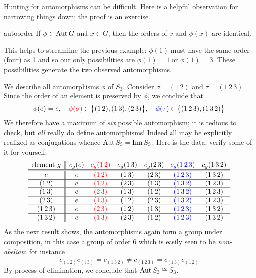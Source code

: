 Hunting for automorphisms can be difficult. Here is a helpful observation for narrowing things down; the proof is an exercise.

\begin{lemm}{}{autoorder}
If $\phi\in\operatorname{Aut} G$ and $x\in G$, then the orders of $x$ and $\phi(x)$ are identical.
\end{lemm}

This helps to streamline the previous example: $\phi(1)$ must have the same order (four) as 1 and so our only possibilities are $\phi(1)=1$ or $\phi(1)=3$. These possibilities generate the two observed automorphisms.
% 

\goodbreak


\begin{example}{}{}
We describe all automorphisms $\phi$ of $S_3$. Consider $\sigma=(1\,2)$ and $\tau=(1\,2\,3)$. Since the order of an element is preserved by $\phi$, we conclude that
  \[\phi(e)=e,\quad \textcolor{red}{\phi(\sigma)}\in\bigl\{(1\,2),(1\,3),(2\,3)\bigr\},\quad \textcolor{blue}{\phi(\tau)}\in \bigl\{(1\,2\,3),(1\,3\,2)\bigr\}\]
  We therefore have a maximum of \emph{six} possible automorphism; it is tedious to check, but \emph{all} really do define automorphisms! Indeed all may be explicitly realized as conjugations whence $\operatorname{Aut} S_3=\operatorname{Inn} S_3$. Here is the data; verify some of it for yourself:\vspace{-2pt}
  \[
  \begin{array}{c||cccccc}
  \text{element $g$}&c_g(e)&\textcolor{red}{c_g(1\,2)}&c_g(1\,3)&c_g(2\,3)&\textcolor{blue}{c_g(1\,2\,3)}&c_g(1\,3\,2)\\\hline\hline
  e&e&\textcolor{red}{(1\,2)}&(1\,3)&(2\,3)&\textcolor{blue}{(1\,2\,3)}&(1\,3\,2)\\\hline
  (1\,2)&e&\textcolor{red}{(1\,2)}&(2\,3)&(1\,3)&\textcolor{blue}{(1\,3\,2)}&(1\,2\,3)\\\hline
  (1\,3)&e&\textcolor{red}{(2\,3)}&(1\,3)&(1\,2)&\textcolor{blue}{(1\,3\,2)}&(1\,2\,3)\\\hline
  (2\,3)&e&\textcolor{red}{(1\,3)}&(1\,2)&(2\,3)&\textcolor{blue}{(1\,3\,2)}&(1\,2\,3)\\\hline
  (1\,2\,3)&e&\textcolor{red}{(2\,3)}&(1\,2)&(1\,3)&\textcolor{blue}{(1\,2\,3)}&(1\,3\,2)\\\hline
  (1\,3\,2)&e&\textcolor{red}{(1\,3)}&(2\,3)&(1\,2)&\textcolor{blue}{(1\,2\,3)}&(1\,3\,2)
  \end{array}
  \]
  As the next result shows, the automorphisms again form a group under composition, in this case a group of order 6 which is easily seen to be \emph{non-abelian}: for instance 
  \[c_{(1\,2)}c_{(1\,3)}= c_{(1\,3\,2)}\neq c_{(1\,2\,3)}= c_{(1\,3)}c_{(1\,2)}\]
  By process of elimination, we conclude that $\operatorname{Aut} S_3\cong S_3$.
\end{example}


